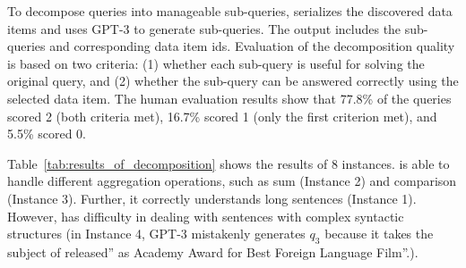 To decompose queries into manageable sub-queries, \sys serializes the discovered data items and uses GPT-3 to generate sub-queries. The output includes the sub-queries and corresponding data item ids. Evaluation of the decomposition quality is based on two criteria: (1) whether each sub-query is useful for solving the original query, and (2) whether the sub-query can be answered correctly using the selected data item. The human evaluation results show that 77.8\% of the queries scored 2 (both criteria met), 16.7\% scored 1 (only the first criterion met), and 5.5\% scored 0. 

Table~\ref{tab:results_of_decomposition} shows the results of 8 instances. \sys is able to handle different aggregation operations, such as sum (Instance 2) and comparison (Instance 3). Further, it correctly understands long sentences (Instance 1). However, \sys has difficulty in dealing with sentences with complex syntactic structures (\eg in Instance 4, GPT-3 mistakenly generates $q_3$ because it takes the subject of released'' as Academy Award for Best Foreign Language Film''.). 


